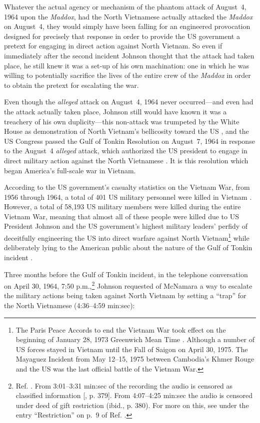\documentclass[letterpaper,12pt]{article}
\begin{document}
Whatever the actual agency or mechanism of the phantom attack of August~4, 1964 upon the \emph{Maddox}, had the North Vietnamese actually attacked the \emph{Maddox} on August~4, they would simply have been falling for an engineered provocation designed for precisely that response in order to provide the US government a pretext for engaging in direct action against North Vietnam. So even if immediately after the second incident Johnson thought that the attack had taken place, he still knew it was a set-up of his own machination: one in which he was willing to potentially sacrifice the lives of the entire crew of the \emph{Maddox} in order to obtain the pretext for escalating the war.

Even though the \emph{alleged} attack on August~4, 1964 never occurred---and even had the attack actually taken place, Johnson still would have known it was a treachery of his own duplicity---this non-attack was trumpeted by the White House as demonstration of North Vietnam's bellicosity toward the US \cite{Johnson1964-08-05SU}, and the US Congress passed the Gulf of Tonkin Resolution on August~7, 1964 in response to the August~4 \emph{alleged} attack, which authorized the US president to engage in direct military action against the North Vietnamese \cite{Congress1964GT}. It is this resolution which began America's full-scale war in Vietnam.

According to the US government's casualty statistics on the Vietnam War, from 1956 through 1964, a total of 401 US military personnel were killed in Vietnam \cite{NARA2007}. However, a total of 58,193 US military members were killed during the entire Vietnam War, meaning that almost all of these people were killed due to US President Johnson and the US government's highest military leaders' perfidy of deceitfully engineering the US into direct warfare against North Vietnam\footnote{The Paris Peace Accords to end the Vietnam War took effect on the beginning of January 28, 1973 Greenwich Mean Time \cite{BPA1973}. Although a number of US forces stayed in Vietnam until the Fall of Saigon on April 30, 1975. The Mayaguez Incident from May 12--15, 1975 between Cambodia's Khmer Rouge and the US was the last official battle of the Vietnam War.} while deliberately lying to the American public about the nature of the Gulf of Tonkin incident \cite{Johnson1964-08-05SU}.

Three months before the Gulf of Tonkin incident, in the telephone conversation on April 30, 1964, 7:50 p.m.,\footnote{Ref. . From 3:01--3:31 min:sec of the recording the audio is censored as classified information [, p. 379]. From 4:07--4:25 min:sec the audio is censored under deed of gift restriction (ibid., p. 380). For more on this, see under the entry ``Restriction'' on p.~9 of Ref. .} Johnson requested of McNamara a way to escalate the military actions being taken against North Vietnam by setting a ``trap'' for the North Vietnamese (4:36--4:59 min:sec):
\end{document}
